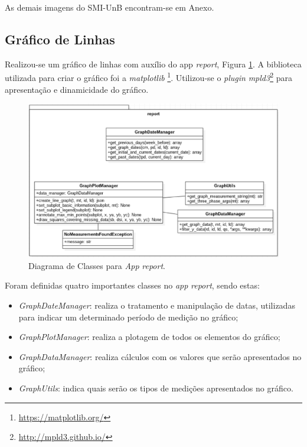As demais imagens do SMI-UnB encontram-se em Anexo.

\subsection{Gráfico de Linhas}
Realizou-se um gráfico de linhas com auxílio do app \textit{report}, Figura \ref{app_report}. A biblioteca utilizada para criar o gráfico foi a \textit{matplotlib} \footnote{\url{https://matplotlib.org/}}. Utilizou-se o \textit{plugin} \textit{mpld3}\footnote{\url{http://mpld3.github.io/}} para apresentação e dinamicidade do gráfico.

\begin{figure}[!h]
    \centering
    \includegraphics[keepaspectratio=true,scale=0.6]{figuras/app_report.eps}
    \caption{Diagrama de Classes para \textit{App} \textit{report}.}
    \label{app_report}
\end{figure}

Foram definidas quatro importantes classes no \textit{app} \textit{report}, sendo estas:

\begin{itemize}
    \item \textit{GraphDateManager}: realiza o tratamento e manipulação de datas, utilizadas para indicar um determinado período de medição no gráfico;
    \item \textit{GraphPlotManager}: realiza a plotagem de todos os elementos do gráfico;
    \item \textit{GraphDataManager}: realiza cálculos com os valores que serão apresentados no gráfico;
    \item \textit{GraphUtils}: indica quais serão os tipos de medições apresentados no gráfico.
\end{itemize}

